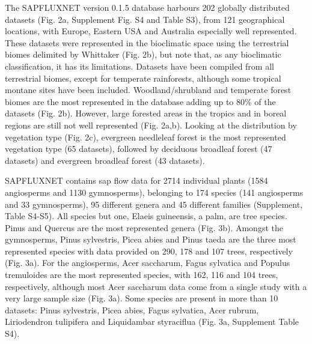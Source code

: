 \documentclass[11pt,twoside]{reedthesis}
\begin{document}
The SAPFLUXNET version 0.1.5 database harbours 202 globally distributed
datasets (Fig. 2a, Supplement Fig. S4 and Table S3), from 121
geographical locations, with Europe, Eastern USA and Australia
especially well represented. These datasets were represented in the
bioclimatic space using the terrestrial biomes delimited by Whittaker
(Fig. 2b), but note that, as any bioclimatic classification, it has its
limitations. Datasets have been compiled from all terrestrial biomes,
except for temperate rainforests, although some tropical montane sites
have been included. Woodland/shrubland and temperate forest biomes are
the most represented in the database adding up to 80\% of the datasets
(Fig. 2b). However, large forested areas in the tropics and in boreal
regions are still not well represented (Fig. 2a,b). Looking at the
distribution by vegetation type (Fig. 2c), evergreen needleleaf forest
is the most represented vegetation type (65 datasets), followed by
deciduous broadleaf forest (47 datasets) and evergreen broadleaf forest
(43 datasets).\par

SAPFLUXNET contains sap flow data for 2714 individual plants (1584
angiosperms and 1130 gymnosperms), belonging to 174 species (141
angiosperms and 33 gymnosperms), 95 different genera and 45 different
families (Supplement, Table S4-S5). All species but one, Elaeis
guineensis, a palm, are tree species. Pinus and Quercus are the most
represented genera (Fig. 3b). Amongst the gymnosperms, Pinus sylvestris,
Picea abies and Pinus taeda are the three most represented species with
data provided on 290, 178 and 107 trees, respectively (Fig. 3a). For the
angiosperms, Acer saccharum, Fagus sylvatica and Populus tremuloides are
the most represented species, with 162, 116 and 104 trees, respectively,
although most Acer saccharum data come from a single study with a very
large sample size (Fig. 3a). Some species are present in more than 10
datasets: Pinus sylvestris, Picea abies, Fagus sylvatica, Acer rubrum,
Liriodendron tulipifera and Liquidambar styraciflua (Fig. 3a, Supplement
Table S4).\par
\end{document}
